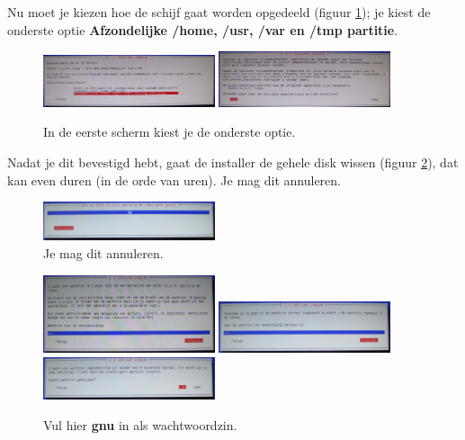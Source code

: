 \documentclass[12pt,a4paper]{article}
\begin{document}
Nu moet je kiezen hoe de schijf gaat worden opgedeeld (figuur \ref{fig:aparte-partities}); je kiest de onderste optie \textbf{Afzondelijke /home, /usr, /var en /tmp partitie}.

\begin{figure}[H]
\centering
\includegraphics[width=0.45\textwidth]{schijf-indelen-afzonderlijke-partities}
\includegraphics[width=0.45\textwidth]{lvm-instellen-scherm}
\caption{In de eerste scherm kiest je de onderste optie.}
\label{fig:aparte-partities}
\end{figure}


Nadat je dit bevestigd hebt, gaat de installer de gehele disk wissen (figuur \ref{fig:schijf-wissen}), dat kan even duren (in de orde van uren). Je mag dit annuleren.

\begin{figure}[H]
\centering
\includegraphics[width=0.45\textwidth]{schijven-wissen-scherm}
\caption{Je mag dit annuleren.}
\label{fig:schijf-wissen}
\end{figure}

\begin{figure}[H]
\centering
\includegraphics[width=0.45\textwidth]{schijven-wachtwoordzin-scherm}
\includegraphics[width=0.45\textwidth]{schijven-wachtwoordzin-bevestiging}
\includegraphics[width=0.45\textwidth]{schijven-zwakke-wachtwoordzin}
\caption{Vul hier \textbf{gnu} in als wachtwoordzin.}
\label{fig:wachtwoordzin-scherm}
\end{figure}
\end{document}
